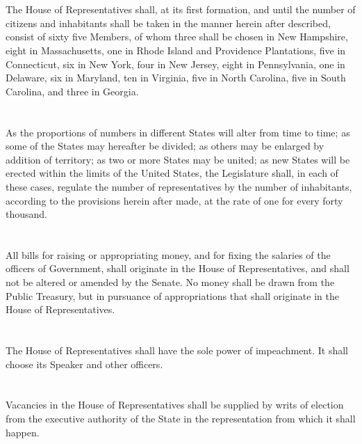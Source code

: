 \documentclass{constitution}
\begin{document}
\section{}
The House of Representatives shall, at its first formation,
and until the number of citizens and inhabitants shall be taken in the manner herein after described,
consist of sixty five Members,
of whom three shall be chosen in New Hampshire, eight in Massachusetts, one in Rhode Island and Providence Plantations, five in Connecticut, six in New York, four in New Jersey, eight in Pennsylvania, one in Delaware, six in Maryland, ten in Virginia, five in North Carolina, five in South Carolina, and three in Georgia.

\section{}
As the proportions of numbers in different States will alter from time to time;
as some of the States may hereafter be divided;
as others may be enlarged by addition of territory;
as two or more States may be united;
as new States will be erected within the limits of the United States,
the Legislature shall, in each of these cases,
regulate the number of representatives by the number of inhabitants,
according to the provisions herein after made, at the rate of one for every forty thousand.

\section{}
All bills for raising or appropriating money, and for fixing the salaries of the officers of Government, shall originate in the House of Representatives,
and shall not be altered or amended by the Senate.
No money shall be drawn from the Public Treasury,
but in pursuance of appropriations that shall originate in the House of Representatives.

\section{}
The House of Representatives shall have the sole power of impeachment.
It shall choose its Speaker and other officers.

\section{}
Vacancies in the House of Representatives shall be supplied by writs of election
from the executive authority of the State in the representation from which it shall happen.
\end{document}
